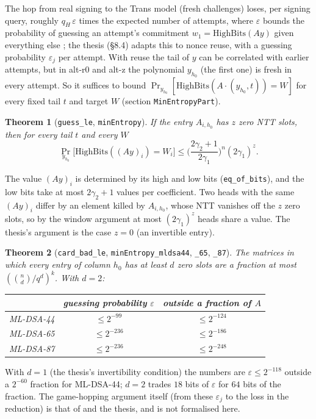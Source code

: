 \documentclass[11pt]{article}
\newtheorem{theorem}{Theorem}
\theoremstyle{definition}
\theoremstyle{remark}
\newcommand{\lean}[1]{\texttt{#1}}
\renewcommand{\Pr}{\mathop{\mathrm{Pr}}}
\begin{document}
The hop from real signing to the Trans model (fresh challenges) loses, per signing query, roughly
$q_H\,\varepsilon$ times the expected number of attempts, where $\varepsilon$ bounds the
probability of guessing an attempt's commitment $w_1 = \mathrm{HighBits}(Ay)$ given everything
else \cite{BBDD23}; the thesis (\S8.4) adapts this to nonce reuse, with a guessing probability
$\varepsilon_j$ per attempt. With reuse the tail of $y$ can be correlated with earlier attempts,
but in alt-r0 and alt-z the polynomial $y_{h_0}$ (the first one) is fresh in every attempt. So it
suffices to bound $\Pr_{y_{h_0}}[\mathrm{HighBits}(A\cdot(y_{h_0},t)) = W]$ for every fixed tail
$t$ and target $W$ (section \lean{MinEntropyPart}).

\begin{theorem}[\lean{guess\_le}, \lean{minEntropy}]
If the entry $A_{i,h_0}$ has $z$ zero NTT slots, then for every tail $t$ and every $W$
\[
  \Pr_{y_{h_0}}\big[\mathrm{HighBits}((A y)_i) = W_i\big]
  \le \Big(\frac{2\gamma_2 + 1}{2\gamma_1}\Big)^{n} (2\gamma_1)^{z}.
\]
\end{theorem}
The value $(Ay)_i$ is determined by its high and low bits (\lean{eq\_of\_bits}), and the low bits
take at most $2\gamma_2+1$ values per coefficient. Two heads with the same $(Ay)_i$ differ by an
element killed by $A_{i,h_0}$, whose NTT vanishes off the $z$ zero slots, so by the window
argument at most $(2\gamma_1)^z$ heads share a value. The thesis's argument is the case $z = 0$
(an invertible entry).

\begin{theorem}[\lean{card\_bad\_le}, \lean{minEntropy\_mldsa44}, \lean{\_65}, \lean{\_87}]
The matrices in which every entry of column $h_0$ has at least $d$ zero slots are a fraction at
most $(\binom nd / q^d)^k$. With $d = 2$:
\begin{center}
\begin{tabular}{@{}lcc@{}}
\toprule
 & guessing probability $\varepsilon$ & outside a fraction of $A$\\
\midrule
ML-DSA-44 & $\le 2^{-99}$ & $\le 2^{-124}$\\
ML-DSA-65 & $\le 2^{-236}$ & $\le 2^{-186}$\\
ML-DSA-87 & $\le 2^{-236}$ & $\le 2^{-248}$\\
\bottomrule
\end{tabular}
\end{center}
\end{theorem}
With $d = 1$ (the thesis's invertibility condition) the numbers are $\varepsilon \le 2^{-118}$
outside a $2^{-60}$ fraction for ML-DSA-44; $d = 2$ trades $18$ bits of $\varepsilon$ for $64$
bits of the fraction. The game-hopping argument itself (from these $\varepsilon_j$ to the loss in
the reduction) is that of \cite{BBDD23} and the thesis, and is not formalised here.
\end{document}
